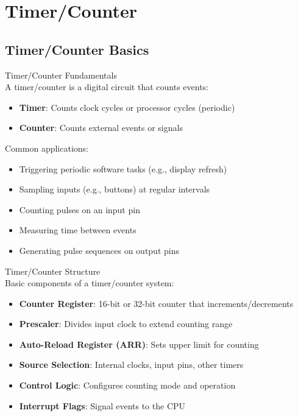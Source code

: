 \section{Timer/Counter}

\subsection{Timer/Counter Basics}

\begin{minipage}{0.54\linewidth}
\begin{concept}{Timer/Counter Fundamentals}\\
A timer/counter is a digital circuit that counts events:
\begin{itemize}
    \item \textbf{Timer}: Counts clock cycles or processor cycles (periodic)
    \item \textbf{Counter}: Counts external events or signals
\end{itemize}
Common applications:
\begin{itemize}
    \item Triggering periodic software tasks (e.g., display refresh)
    \item Sampling inputs (e.g., buttons) at regular intervals
    \item Counting pulses on an input pin
    \item Measuring time between events
    \item Generating pulse sequences on output pins
\end{itemize}
\end{concept}

\begin{definition}{Timer/Counter Structure}\\
Basic components of a timer/counter system:
\begin{itemize}
    \item \textbf{Counter Register}: 16-bit or 32-bit counter that increments/decrements
    \item \textbf{Prescaler}: Divides input clock to extend counting range
    \item \textbf{Auto-Reload Register (ARR)}: Sets upper limit for counting
    \item \textbf{Source Selection}: Internal clocks, input pins, other timers
    \item \textbf{Control Logic}: Configures counting mode and operation
    \item \textbf{Interrupt Flags}: Signal events to the CPU
\end{itemize}
\end{definition}
\end{minipage}
